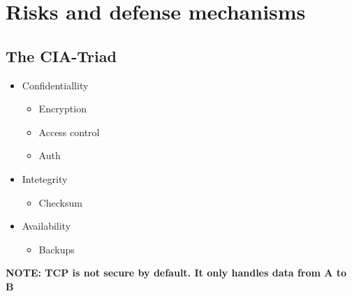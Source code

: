 \section{Risks and defense mechanisms}

\subsection{The CIA-Triad}
\begin{flushleft}
	\begin{itemize}
		\item Confidentiallity
			\begin{itemize}
				\item Encryption
				\item Access control
				\item Auth
			\end{itemize}
		\item Intetegrity
			\begin{itemize}
				\item Checksum
			\end{itemize}
		\item Availability
			\begin{itemize}
				\item Backups
			\end{itemize}
	\end{itemize}

\textbf{NOTE: TCP is not secure by default. It only handles data from A to B}
\end{flushleft}
